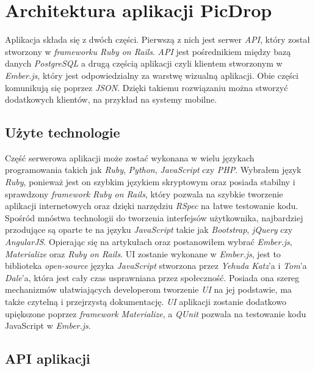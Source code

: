 \documentclass[openright]{xmgr}
\begin{document}
\chapter{Architektura aplikacji PicDrop}
Aplikacja składa się z dwóch części. Pierwszą z nich jest serwer \textit{API}, który został stworzony w \textit{frameworku Ruby on Rails}. \textit{API} jest pośrednikiem między bazą danych \textit{PostgreSQL} a drugą częścią aplikacji czyli klientem stworzonym w \textit{Ember.js}, który jest odpowiedzialny za warstwę wizualną aplikacji. Obie części komunikują się poprzez \textit{JSON}. Dzięki takiemu rozwiązaniu można stworzyć dodatkowych klientów, na przykład na systemy mobilne.

\section{Użyte technologie}
Część serwerowa aplikacji może zostać wykonana w wielu językach programowania takich jak \textit{Ruby}, \textit{Python}, \textit{JavaScript} czy \textit{PHP}.
Wybrałem język \textit{Ruby}, ponieważ jest on szybkim językiem skryptowym oraz posiada stabilny i sprawdzony \textit{framework} \textit{Ruby on Rails}, który pozwala na szybkie tworzenie aplikacji internetowych oraz dzięki narzędziu \textit{RSpec} na łatwe testowanie kodu.
Spośród mnóstwa technologii do tworzenia interfejsów użytkownika, najbardziej przodujące są oparte te na języku \textit{JavaScript} takie jak \textit{Bootstrap},\textit{ jQuery} czy \textit{AngularJS}. Opierając się na artykułach \cite{emberRails} oraz \cite{Ember} postanowiłem wybrać \textit{Ember.js}, \textit{Materialize} oraz \textit{Ruby on Rails}. UI zostanie wykonane w \textit{Ember.js}, jest to  biblioteka  \textit{open-source} języka \textit{JavaScript} stworzona  przez  \textit{Yehuda Katz}'a i \textit{Tom}'a \textit{Dale}'a, która jest cały czas usprawniana przez społeczność. Posiada ona szereg mechanizmów ułatwiających developerom tworzenie \textit{UI} na jej podstawie, ma także czytelną i przejrzystą dokumentację. \textit{UI} aplikacji zostanie dodatkowo upiększone poprzez \textit{framework Materialize}, a \textit{QUnit} pozwala na testowanie kodu JavaScript w \textit{Ember.js}.

\section{API aplikacji}
\end{document}
